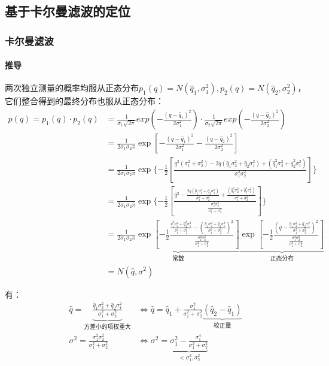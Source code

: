 \documentclass[
12pt, %
a4paper, 
oneside, %
headinclude,footinclude, %
]{scrartcl}
\begin{document}
\subsection[基于卡尔曼滤波的定位]{基于卡尔曼滤波的定位}
\subsubsection[卡尔曼滤波]{卡尔曼滤波}
\paragraph{推导}
两次独立测量的概率均服从正态分布$ p_1(q) = N(\hat{q}_1, \sigma_1^2), p_2(q) = N(\hat{q}_2, \sigma_2^2) $，它们整合得到的最终分布也服从正态分布：
\begin{align*}
p(q) = p_1(q) \cdot p_2(q) &= \frac{1}{\sigma_1 \sqrt{2\pi}}exp(-\frac{(q - \hat{q}_1)^2}{2\sigma_1^2}) \cdot \frac{1}{\sigma_2 \sqrt{2\pi}}exp(-\frac{(q - \hat{q}_2)^2}{2\sigma_2^2}) \\
&= \frac{1}{2\sigma_1 \sigma_2 \pi}\exp[-\frac{(q - \hat{q}_1)^2}{2\sigma_1^2} - \frac{(q - \hat{q}_2)^2}{2\sigma_2^2}] \\
&= \frac{1}{2\sigma_1 \sigma_2 \pi}\exp\{-\frac{1}{2}[\frac{q^2(\sigma_1^2 + \sigma_2^2) - 2q(\hat{q}_1 \sigma_2^2 + \hat{q}_2 \sigma_1^2) + (\hat{q}_1^2 \sigma_2^2 + \hat{q}_2^2 \sigma_1^2)}{\sigma_1^2 \sigma_2^2}]\} \\
&= \frac{1}{2\sigma_1 \sigma_2 \pi}\exp\{-\frac{1}{2}[\frac{q^2 - \frac{2q(\hat{q}_1 \sigma_2^2 + \hat{q}_2 \sigma_1^2)}{\sigma_1^2 + \sigma_2^2} + \frac{(\hat{q}_1^2 \sigma_2^2 + \hat{q}_2^2 \sigma_1^2)}{\sigma_1^2 + \sigma_2^2}}{\frac{\sigma_1^2 \sigma_2^2}{\sigma_1^2 + \sigma_2^2}}]\} \\
&= \underbrace{\frac{1}{2\sigma_1 \sigma_2 \pi}\exp[-\frac{1}{2}\frac{\frac{\hat{q}_1^2 \sigma_2^2 + \hat{q}_2^2 \sigma_1^2}{\sigma_1^2 + \sigma_2^2} - (\frac{\hat{q}_1 \sigma_2^2 + \hat{q}_2 \sigma_1^2}{\sigma_1^2 + \sigma_2^2})^2}{\frac{\sigma_1^2 \sigma_2^2}{\sigma_1^2 + \sigma_2^2}}]}_{\text{常数}}\underbrace{\exp[-\frac{1}{2}\frac{(q - \frac{\hat{q}_1 \sigma_2^2 + \hat{q}_2 \sigma_1^2}{\sigma_1^2 + \sigma_2^2})^2}{\frac{\sigma_1^2 \sigma_2^2}{\sigma_1^2 + \sigma_2^2}}]}_{\text{正态分布}} \\
&= N(\hat{q}, \sigma^2)
\end{align*}

有：
\begin{align*}
\hat{q} = \underbrace{\frac{\hat{q}_1 \sigma_2^2 + \hat{q}_2 \sigma_1^2}{\sigma_1^2 + \sigma_2^2}}_{\text{方差小的项权重大}} &\Leftrightarrow \hat{q} = \hat{q}_1 + \frac{\sigma_1^2}{\sigma_1^2 + \sigma_2^2}\underbrace{(\hat{q}_2 - \hat{q}_1)}_{\text{校正量}} \\
\sigma^2 = \frac{\sigma_1^2 \sigma_2^2}{\sigma_1^2 + \sigma_2^2} &\Leftrightarrow \sigma^2 = \underbrace{\sigma_1^2 - \frac{\sigma_1^4}{\sigma_1^2 + \sigma_2^2}}_{< \sigma_1^2, \sigma_2^2}
\end{align*}
\end{document}
